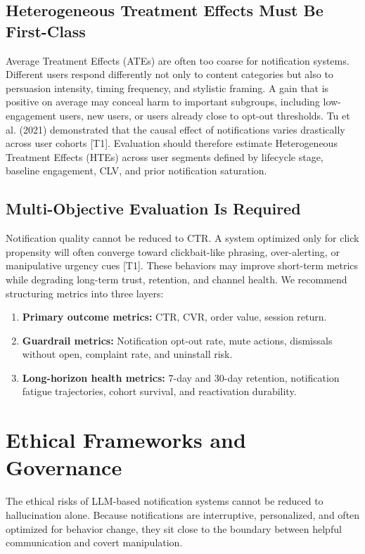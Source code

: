 \documentclass[sigconf]{acmart}
\begin{document}
\subsection{Heterogeneous Treatment Effects Must Be First-Class}

Average Treatment Effects (ATEs) are often too coarse for notification systems. Different users respond differently not only to content categories but also to persuasion intensity, timing frequency, and stylistic framing. A gain that is positive on average may conceal harm to important subgroups, including low-engagement users, new users, or users already close to opt-out thresholds. Tu et al. (2021) demonstrated that the causal effect of notifications varies drastically across user cohorts \cite{tu2021personalized} [T1]. Evaluation should therefore estimate Heterogeneous Treatment Effects (HTEs) across user segments defined by lifecycle stage, baseline engagement, CLV, and prior notification saturation.

\subsection{Multi-Objective Evaluation Is Required}

Notification quality cannot be reduced to CTR. A system optimized only for click propensity will often converge toward clickbait-like phrasing, over-alerting, or manipulative urgency cues \cite{jannach2023survey} [T1]. These behaviors may improve short-term metrics while degrading long-term trust, retention, and channel health. We recommend structuring metrics into three layers:

\begin{enumerate}
    \item \textbf{Primary outcome metrics:} CTR, CVR, order value, session return.
    \item \textbf{Guardrail metrics:} Notification opt-out rate, mute actions, dismissals without open, complaint rate, and uninstall risk.
    \item \textbf{Long-horizon health metrics:} 7-day and 30-day retention, notification fatigue trajectories, cohort survival, and reactivation durability.
\end{enumerate}

\section{Ethical Frameworks and Governance}

The ethical risks of LLM-based notification systems cannot be reduced to hallucination alone. Because notifications are interruptive, personalized, and often optimized for behavior change, they sit close to the boundary between helpful communication and covert manipulation.
\end{document}
